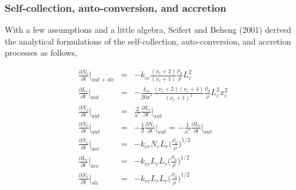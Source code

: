 \begin{table}[h]
\begin{center}
\caption{Hydrometeors that result from binary collision. Collecting hydrometeors are written in the 1st row and collected hydrometeors are written in the 1st column.}
\label{table_sn13-16}
\end{center}
\end{table}

\subsubsection{Self-collection, auto-conversion, and accretion}
With a few assumptions and a little algebra, Seifert and Beheng (2001) derived the analytical formulations of the self-collection, auto-conversion, and accretion processes as follows,

\begin{eqnarray}
\frac{\partial N_{c}}{\partial t}\Bigr|_{aut+sle}&=&-k_{cc}\frac{(\nu_{c}+2)}{(\nu_{c}+1)}\frac{\rho_{0}}{\rho}L_{c}^{2}\label{sn142}\\
\frac{\partial L_{c}}{\partial t}\Bigr|_{aut}&=&-\frac{k_{cc}}{20x^{*}}\frac{(\nu_{c}+2)(\nu_{c}+4)}{(\nu_{c}+1)^{2}}\frac{\rho_{0}}{\rho}L_{c}^{2}x_{c}^{2}\label{sn143}\\
\frac{\partial N_{c}}{\partial t}\Bigr|_{aut}&=&\frac{2}{x^{*}}\frac{\partial L_{c}}{\partial t}\Bigr|_{aut}\label{sn144}\\
\frac{\partial N_{r}}{\partial t}\Bigr|_{aut}&=&-\frac{1}{2}\frac{\partial N_{c}}{\partial t}\Bigr|_{aut}=-\frac{1}{x^{*}}\frac{\partial L_{c}}{\partial t}\Bigr|_{aut}\label{sn145}\\
\frac{\partial N_{c}}{\partial t}\Bigr|_{acc}&=&-k_{cr}N_{c}L_{r}\bigl(\frac{\rho_{0}}{\rho}\bigr)^{1/2}\label{sn146}\\
\frac{\partial L_{c}}{\partial t}\Bigr|_{acc}&=&-k_{cr}L_{c}L_{r}\bigl(\frac{\rho_{0}}{\rho}\bigr)^{1/2}\label{sn147}\\
\frac{\partial N_{r}}{\partial t}\Bigr|_{slc}&=&-k_{rr}L_{r}L_{r}\bigl(\frac{\rho_{0}}{\rho}\bigr)^{1/2}\label{sn148}
\end{eqnarray}

